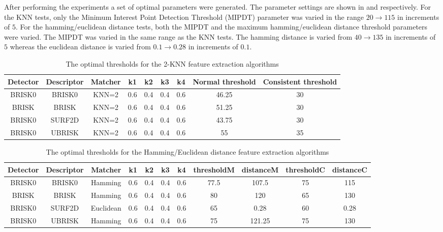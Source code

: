 \documentclass{article}
\begin{document}
After performing the experiments a set of optimal parameters were generated. The parameter settings are shown in  and  respectively. For the KNN tests, only the Minimum Interest Point Detection Threshold (MIPDT) parameter was varied in the range $20 \rightarrow 115$ in increments of $5$. For the hamming/euclidean distance tests, both the MIPDT and the maximum hamming/euclidean distance threshold parameters were varied. The MIPDT was varied in the same range as the KNN tests. The hamming distance is varied from $40 \rightarrow 135$ in increments of $5$ whereas the euclidean distance is varied from $0.1 \rightarrow 0.28$ in increments of $0.1$. \\



\begin{table}
\caption{The optimal thresholds for the 2-KNN feature extraction algorithms}
\begin{tabular}{|c|c|c|c|c|c|c|c|c|}
\hline 
Detector & Descriptor & Matcher & k1 & k2 & k3 & k4 & Normal threshold & Consistent threshold\tabularnewline
\hline 
\hline 
BRISK0 & BRISK0 & KNN=2 & 0.6 & 0.4 & 0.4 & 0.6 & 46.25 & 30\tabularnewline
\hline 
BRISK & BRISK & KNN=2 & 0.6 & 0.4 & 0.4 & 0.6 & 51.25 & 30\tabularnewline
\hline 
BRISK0 & SURF2D & KNN=2 & 0.6 & 0.4 & 0.4 & 0.6 & 43.75 & 30\tabularnewline
\hline 
BRISK0 & UBRISK & KNN=2 & 0.6 & 0.4 & 0.4 & 0.6 & 55 & 35\tabularnewline
\hline 
\end{tabular}
\label{tab:knnStatistics}
\end{table}

\begin{table}
\caption{The optimal thresholds for the Hamming/Euclidean distance feature extraction algorithms}
\begin{tabular}{|c|c|c|c|c|c|c|c|c|c|c|}
\hline 
Detector & Descriptor & Matcher & k1 & k2 & k3 & k4 & thresholdM & distanceM & thresholdC & distanceC\tabularnewline
\hline 
\hline 
BRISK0 & BRISK0 & Hamming & 0.6 & 0.4 & 0.4 & 0.6 & 77.5 & 107.5 & 75 & 115\tabularnewline
\hline 
BRISK & BRISK & Hamming & 0.6 & 0.4 & 0.4 & 0.6 & 80 & 120 & 65 & 130\tabularnewline
\hline 
BRISK0 & SURF2D & Euclidean & 0.6 & 0.4 & 0.4 & 0.6 & 65 & 0.28 & 60 & 0.28\tabularnewline
\hline 
BRISK0 & UBRISK & Hamming & 0.6 & 0.4 & 0.4 & 0.6 & 75 & 121.25 & 75 & 130\tabularnewline
\hline 
\end{tabular}
\label{tab:hammingStatistics}
\end{table}
\end{document}
